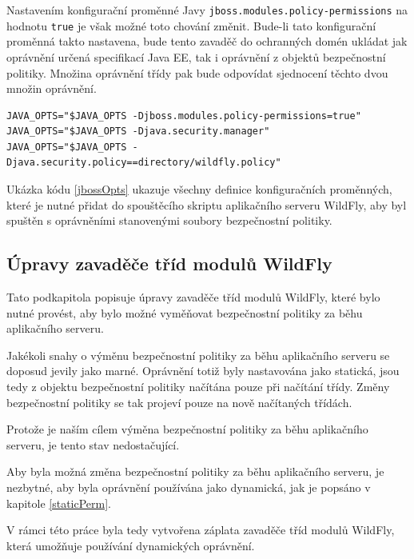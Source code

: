 Nastavením konfigurační proměnné Javy {\tt jboss.modules.policy-permissions} na hodnotu {\tt true} je však možné toto chování změnit.
Bude-li tato konfigurační proměnná takto nastavena, bude tento zavaděč do ochranných domén ukládat jak oprávnění určená specifikací Java EE, tak i oprávnění z objektů bezpečnostní politiky.
Množina oprávnění třídy pak bude odpovídat sjednocení těchto dvou množin oprávnění.
\cite{sourceModuleClassLoader}

\begin{lstlisting}[caption=Úprava spouštěcího skriptu pro spuštění se souborem bezpečnostní politiky, label=jbossOpts]
JAVA_OPTS="$JAVA_OPTS -Djboss.modules.policy-permissions=true"
JAVA_OPTS="$JAVA_OPTS -Djava.security.manager"
JAVA_OPTS="$JAVA_OPTS -Djava.security.policy==directory/wildfly.policy"
\end{lstlisting}

Ukázka kódu \ref{jbossOpts} ukazuje všechny definice konfiguračních proměnných, které je nutné přidat do spouštěcího skriptu aplikačního serveru WildFly,
aby byl spuštěn s oprávněními stanovenými soubory bezpečnostní politiky.

\subsection{Úpravy zavaděče tříd modulů WildFly} \label{zmenaZaBehu}

Tato podkapitola popisuje úpravy zavaděče tříd modulů WildFly, které bylo nutné provést, aby bylo možné vyměňovat bezpečnostní politiky za běhu aplikačního serveru.

Jakékoli snahy o výměnu bezpečnostní politiky za běhu aplikačního serveru se doposud jevily jako marné. Oprávnění totiž byly nastavována jako statická,
jsou tedy z objektu bezpečnostní politiky načítána pouze při načítání třídy. Změny bezpečnostní politiky se tak projeví pouze na nově načítaných třídách.

Protože je naším cílem výměna bezpečnostní politiky za běhu aplikačního serveru, je tento stav nedostačující.

Aby byla možná změna bezpečnostní politiky za běhu aplikačního serveru, je nezbytné, aby byla oprávnění používána jako dynamická, jak je popsáno v kapitole \ref{staticPerm}.

V rámci této práce byla tedy vytvořena záplata zavaděče tříd modulů WildFly, která umožňuje používání dynamických oprávnění.

